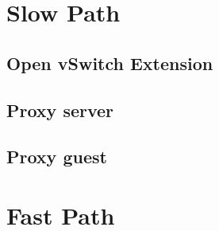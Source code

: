 \section{Slow Path}

\subsection{Open vSwitch Extension}

\subsection{Proxy server}

\subsection{Proxy guest}


\section{Fast Path}